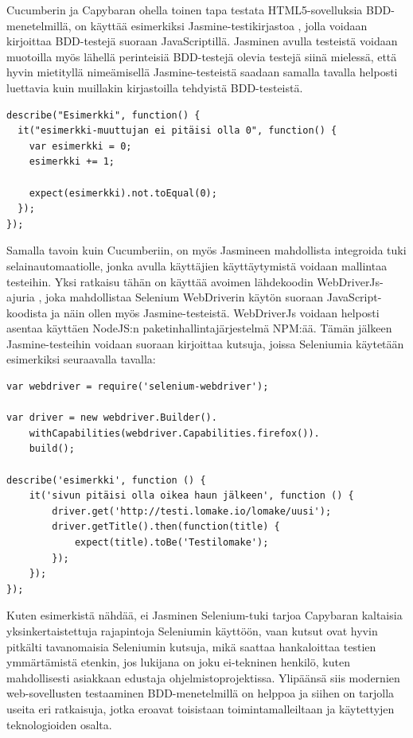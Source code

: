 \documentclass[finnish,nonumbib,nocopyright]{gradu2}
\begin{document}
Cucumberin ja Capybaran ohella toinen tapa testata HTML5-sovelluksia BDD-menetelmillä, on käyttää esimerkiksi Jasmine-testikirjastoa \cite{jasmine}, jolla voidaan kirjoittaa BDD-testejä suoraan JavaScriptillä. Jasminen avulla testeistä voidaan muotoilla myös lähellä perinteisiä BDD-testejä olevia testejä siinä mielessä, että hyvin mietityllä nimeämisellä Jasmine-testeistä saadaan samalla tavalla helposti luettavia kuin muillakin kirjastoilla tehdyistä BDD-testeistä. 
\begin{verbatim}
describe("Esimerkki", function() {
  it("esimerkki-muuttujan ei pitäisi olla 0", function() {
    var esimerkki = 0;
    esimerkki += 1;

    expect(esimerkki).not.toEqual(0);
  });
});
\end{verbatim}
Samalla tavoin kuin Cucumberiin, on myös Jasmineen mahdollista integroida tuki selainautomaatiolle, jonka avulla käyttäjien käyttäytymistä voidaan mallintaa testeihin. Yksi ratkaisu tähän on käyttää avoimen lähdekoodin WebDriverJs-ajuria \cite{webdriverjs}, joka mahdollistaa Selenium WebDriverin \cite{selenium} käytön suoraan JavaScript-koodista ja näin ollen myös Jasmine-testeistä. WebDriverJs voidaan helposti asentaa käyttäen NodeJS:n \cite{nodejs} paketinhallintajärjestelmä NPM:ää. Tämän jälkeen Jasmine-testeihin voidaan suoraan kirjoittaa kutsuja, joissa Seleniumia käytetään esimerkiksi seuraavalla tavalla:
\begin{verbatim}
var webdriver = require('selenium-webdriver');

var driver = new webdriver.Builder().
    withCapabilities(webdriver.Capabilities.firefox()).
    build();

describe('esimerkki', function () {
    it('sivun pitäisi olla oikea haun jälkeen', function () {
        driver.get('http://testi.lomake.io/lomake/uusi');
        driver.getTitle().then(function(title) {
            expect(title).toBe('Testilomake');
        });
    });
});
\end{verbatim} 
Kuten esimerkistä nähdää, ei Jasminen Selenium-tuki tarjoa Capybaran kaltaisia yksinkertaistettuja rajapintoja Seleniumin käyttöön, vaan kutsut ovat hyvin pitkälti tavanomaisia Seleniumin kutsuja, mikä saattaa hankaloittaa testien ymmärtämistä etenkin, jos lukijana on joku ei-tekninen henkilö, kuten mahdollisesti asiakkaan edustaja ohjelmistoprojektissa. Ylipäänsä siis modernien web-sovellusten testaaminen BDD-menetelmillä on helppoa ja siihen on tarjolla useita eri ratkaisuja, jotka eroavat toisistaan toimintamalleiltaan ja käytettyjen teknologioiden osalta.
\end{document}
